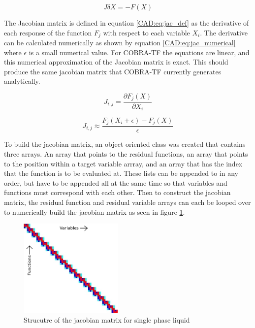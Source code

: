 \documentclass{mc2015}
\begin{document}
    \begin{equation}
    	\label{CAD:eq:linear_system}
    	J \delta X = - F(X)
    \end{equation}
    
    The Jacobian matrix is defined in equation \eqref{CAD:eq:jac_def} as the derivative
    of each response of the function $F_{j}$ with respect to each variable $X_{i}$.
    The derivative can be calculated numerically as shown by equation
    \eqref{CAD:eq:jac_numerical} where $\epsilon$ is a small numerical value. For
    COBRA-TF the equations are linear, and this numerical approximation
    of the Jacobian matrix is exact. This should produce the same jacobian
    matrix that COBRA-TF currently generates analytically. 
    
    \begin{equation}
    	\label{CAD:eq:jac_def}
    	J_{i,j}=\frac{ \partial F_{j}(X)}{\partial X_{i}}
    \end{equation}
    
    \begin{equation}
    	\label{CAD:eq:jac_numerical}
    	J_{i,j}  \approx \frac{F_{j}(X_{i}+\epsilon)-F_{j}(X)}{\epsilon}
    \end{equation}
    
	To build the jacobian matrix, an object oriented class was created that
    contains three arrays. An array that points to the residual functions, an
    array that points to the position within a target variable arrray, and an
    array that has the index that the function is to be evaluated at. These
    lists can be appended to in any order, but have to be appended all at the
    same time so that variables and functions must correspond with each other.
    Then to construct the jacobian matrix, the residual function and residual
    variable arrays can each be looped over to numerically build the jacobian
    matrix as seen in figure \ref{CAD:fig:Jacobian_Setup}. 
    
    \begin{figure}[!h]
    	\centering
    	\includegraphics[width=0.45\textwidth]{images/Jacobian_Setup}
    	\caption{Strucutre of the jacobian matrix for single phase liquid}
    	\label{CAD:fig:Jacobian_Setup}
    \end{figure}
\end{document}
